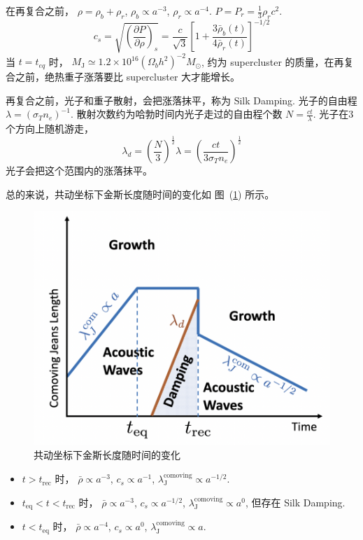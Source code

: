 \documentclass[12pt]{ctexart}
\newcommand{\reffig}[1]{图~(\ref{#1})}
\begin{document}

在再复合之前， 
$\rho = \rho_b+\rho_r$, $\rho_b\propto a^{-3}$, $\rho_r\propto a^{-4}$. 
$P=P_r=\frac{1}{3}\rho_r c^2$.
\begin{equation}
    c_{s}=\sqrt{\left(\frac{\partial P}{\partial \rho}\right)_{s}}=\frac{c}{\sqrt{3}}\left[1+\frac{3 \bar{\rho}_{b}(t)}{4 \bar{\rho}_{r}(t)}\right]^{-1 / 2}
\end{equation}
当 $t=t_{eq}$ 时，
$M_\text{J} \simeq 1.2\times 10^{16} \left(\Omega_b h^2\right)^{-2} M_\odot$,
约为 supercluster 的质量，在再复合之前，绝热重子涨落要比 supercluster 大才能增长。

再复合之前，光子和重子散射，会把涨落抹平，称为
Silk Damping.
光子的自由程 $\lambda = \left(\sigma_T n_e\right)^{-1}$.
散射次数约为哈勃时间内光子走过的自由程个数 $N=\frac{ct}{\lambda}$.
光子在3个方向上随机游走，
\begin{equation}
    \lambda_d = \left(\frac{N}{3}\right)^{\frac{1}{2}} \lambda = \left(\frac{ct}{3\sigma_T n_e}\right)^{\frac{1}{2}}
\end{equation}
光子会把这个范围内的涨落抹平。

总的来说，共动坐标下金斯长度随时间的变化如 \reffig{Jeans_scale} 所示。
\begin{figure}[!hbtp]
	\centering
	\includegraphics[width=1.0\linewidth]{Jeans_scale.png}
	\caption{共动坐标下金斯长度随时间的变化} \label{Jeans_scale}
\end{figure}

\begin{itemize}
    \item $t>t_\text{rec}$ 时，  $\bar{\rho}\propto a^{-3}$, $c_s\propto a^{-1}$, $\lambda_\text{J}^\text{comoving} \propto a^{-1/2}$.
    \item $t_\text{eq}<t<t_\text{rec}$ 时，  $\bar{\rho}\propto a^{-3}$, $c_s\propto a^{-1/2}$, $\lambda_\text{J}^\text{comoving} \propto a^{0}$, 但存在 Silk Damping.
    \item $t<t_\text{eq}$ 时， $\bar{\rho}\propto a^{-4}$, $c_s\propto a^{0}$, $\lambda_\text{J}^\text{comoving} \propto a$.
\end{itemize}
\end{document}
